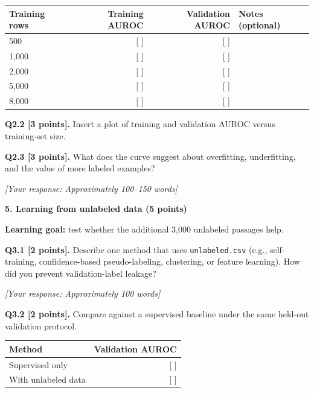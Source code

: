 \documentclass[11pt,letterpaper]{article}
\begin{document}
\vspace{2pt}
\begin{tabularx}{\textwidth}{@{}lrrX@{}}
\toprule
\textbf{Training rows} & \textbf{Training AUROC} & \textbf{Validation AUROC} & \textbf{Notes (optional)} \\
\midrule
500 & [ ] & [ ] & \\
1,000 & [ ] & [ ] & \\
2,000 & [ ] & [ ] & \\
5,000 & [ ] & [ ] & \\
8,000 & [ ] & [ ] & \\
\bottomrule
\end{tabularx}

\vspace{10pt}
\textbf{Q2.2 [3 points].} Insert a plot of training and validation AUROC versus training-set size.

\vspace{10pt}
\begin{center}
\end{center}
\vspace{10pt}

\textbf{Q2.3 [3 points].} What does the curve suggest about overfitting, underfitting, and the value of more labeled examples?

\textit{[Your response: Approximately 100--150 words]}

\vspace{14pt}
{\large\textbf{5. Learning from unlabeled data (5 points)}}
\vspace{2pt}

\textbf{Learning goal:} test whether the additional 3,000 unlabeled passages help.

\vspace{4pt}
\textbf{Q3.1 [2 points].} Describe one method that uses \texttt{unlabeled.csv} (e.g., self-training, confidence-based pseudo-labeling, clustering, or feature learning). How did you prevent validation-label leakage?

\textit{[Your response: Approximately 100 words]}

\vspace{6pt}
\textbf{Q3.2 [2 points].} Compare against a supervised baseline under the same held-out validation protocol.

\vspace{2pt}
\begin{tabularx}{0.65\textwidth}{@{}Xr@{}}
\toprule
\textbf{Method} & \textbf{Validation AUROC} \\
\midrule
Supervised only & [ ] \\
With unlabeled data & [ ] \\
\bottomrule
\end{tabularx}
\end{document}
